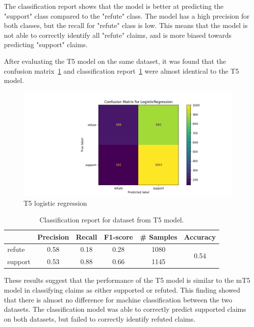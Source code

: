 The classification report shows that the model is better at predicting the "support" class compared to the "refute" class. The model has a high precision for both classes, but the recall for "refute" class is low. This means that the model is not able to correctly identify all "refute" claims, and is more biased towards predicting "support" claims.

After evaluating the T5 model on the same dataset, it was found that the confusion matrix~\ref{fig:t5_regression} and classification report~\ref{tab:T5_classification_report} were almost identical to the T5 model.

\begin{figure}[H]
    \centering
    \includegraphics[scale=0.5]{figures/t5_LogisticRegression.png}
    \caption{T5 logistic regression}
    \label{fig:t5_regression}
\end{figure}

\begin{table}[H]
    \centering
    \begin{tabular}{l|ccccc}
        \hline
        & Precision & Recall & F1-score & \# Samples & Accuracy \\
        \hline
        refute & 0.58 & 0.18 & 0.28 & 1080 & \multirow{2}{*}{0.54}\\
        support & 0.53 & 0.88 & 0.66 & 1145 & \\
        \hline
    \end{tabular}
    \caption{Classification report for dataset from T5 model.}
    \label{tab:T5_classification_report}
\end{table}

These results suggest that the performance of the T5 model is similar to the mT5 model in classifying claims as either supported or refuted. This finding showed that there is almost no difference for machine classification between the two datasets. The classification model was able to correctly predict supported claims on both datasets, but failed to correctly identify refuted claims.

